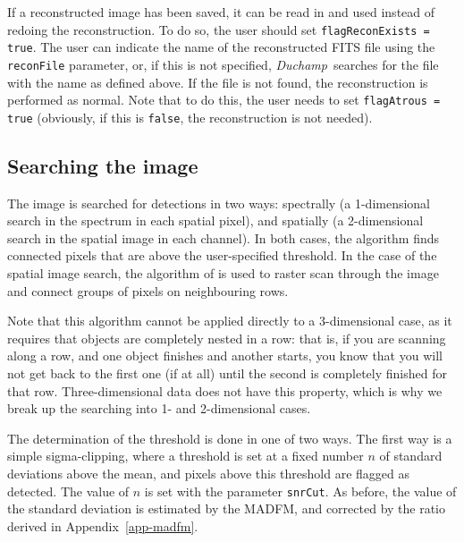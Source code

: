 \documentclass[12pt,a4paper]{article}
\newcommand{\duchamp}{\emph{Duchamp}}
\begin{document}
If a reconstructed image has been saved, it can be read in and used
instead of redoing the reconstruction. To do so, the user should set
\texttt{flagReconExists = true}. The user can indicate the name of the
reconstructed FITS file using the \texttt{reconFile} parameter, or, if
this is not specified, \duchamp\ searches for the file with the name
as defined above. If the file is not found, the reconstruction is
performed as normal. Note that to do this, the user needs to set
\texttt{flagAtrous = true} (obviously, if this is \texttt{false}, the
reconstruction is not needed).

\subsection{Searching the image}
\label{sec-detection}

The image is searched for detections in two ways: spectrally (a
1-dimensional search in the spectrum in each spatial pixel), and
spatially (a 2-dimensional search in the spatial image in each
channel). In both cases, the algorithm finds connected pixels that are
above the user-specified threshold. In the case of the spatial image
search, the algorithm of \citet{lutz80} is used to raster scan through
the image and connect groups of pixels on neighbouring rows.

Note that this algorithm cannot be applied directly to a 3-dimensional
case, as it requires that objects are completely nested in a row: that
is, if you are scanning along a row, and one object finishes and
another starts, you know that you will not get back to the first one
(if at all) until the second is completely finished for that
row. Three-dimensional data does not have this property, which is why
we break up the searching into 1- and 2-dimensional cases.

The determination of the threshold is done in one of two ways. The
first way is a simple sigma-clipping, where a threshold is set at a
fixed number $n$ of standard deviations above the mean, and pixels
above this threshold are flagged as detected. The value of $n$ is set
with the parameter \texttt{snrCut}. As before, the value of the
standard deviation is estimated by the MADFM, and corrected by the
ratio derived in Appendix~\ref{app-madfm}.
\end{document}
